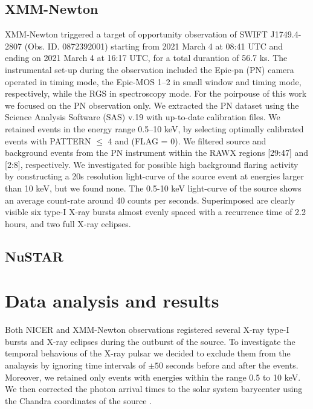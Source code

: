 \documentclass[fleqn,usenatbib]{mnras}
\newcommand{\swiftj}{SWIFT J1749.4-2807}
\begin{document}


\subsection{XMM-Newton}

XMM-Newton \citep{Jansen2001} triggered a target of opportunity observation of \swiftj{} (Obs. ID. 0872392001) starting from 2021 March 4 at 08:41 UTC and ending on 2021 March 4 at 16:17 UTC, for a total durantion of 56.7 ks. 
The instrumental set-up during the observation included the Epic-pn (PN) camera operated in timing mode, the Epic-MOS 1–2 in small window and timing mode, respectively, while the RGS in spectroscopy mode. For the poirpouse of this work we focused on the PN observation only. We extracted the PN dataset using the Science Analysis Software (SAS) v.19 with up-to-date calibration files. We retained events in the energy range 0.5–10 keV, by selecting optimally calibrated events with \textsc{PATTERN $\leq$ 4} and \textsc{(FLAG = 0)}. We filtered source and background events from the PN instrument within the RAWX regions [29:47] and [2:8], respectively. We investigated for possible high background flaring activity by constructing a 20s resolution light-curve of the source event at energies larger than 10 keV, but we found none.  
The 0.5-10 keV light-curve of the source shows an average count-rate around 40 counts per seconds. Superimposed are clearly visible six type-I X-ray bursts almost evenly spaced with a recurrence time of 2.2 hours, and two full X-ray eclipses. 


\subsection{NuSTAR}

\section{Data analysis and results}

Both NICER and XMM-Newton observations registered several X-ray type-I bursts and X-ray eclipses during the outburst of the source. To investigate the temporal behavious of the X-ray pulsar we decided to exclude them from the analaysis by ignoring time intervals of $\pm 50$ seconds before and after the events. Moreover, we retained only events with energies within the range 0.5 to 10 keV. We then corrected the photon arrival times to the solar system barycenter using the Chandra coordinates of the source \citep{Jonker:2013wp}.
\end{document}
